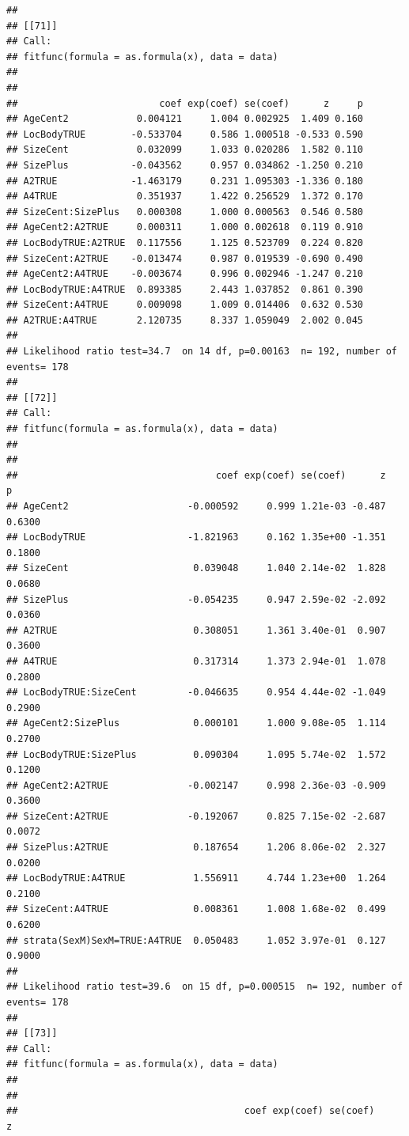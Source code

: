 \documentclass{article}\usepackage[]{graphicx}\usepackage[]{color}
\makeatletter
\newenvironment{kframe}{%
 \def\at@end@of@kframe{}%
 \ifinner\ifhmode%
  \def\at@end@of@kframe{\end{minipage}}%
  \begin{minipage}{\columnwidth}%
 \fi\fi%
 \def\FrameCommand##1{\hskip\@totalleftmargin \hskip-\fboxsep
 \colorbox{shadecolor}{##1}\hskip-\fboxsep
     \hskip-\linewidth \hskip-\@totalleftmargin \hskip\columnwidth}%
 \MakeFramed {\advance\hsize-\width
   \@totalleftmargin\z@ \linewidth\hsize
   \@setminipage}}%
 {\par\unskip\endMakeFramed%
 \at@end@of@kframe}
\newenvironment{knitrout}{}{} %
\makeatother
\begin{document}
\begin{knitrout}
\begin{kframe}
\begin{verbatim}
## 
## [[71]]
## Call:
## fitfunc(formula = as.formula(x), data = data)
## 
## 
##                         coef exp(coef) se(coef)      z     p
## AgeCent2            0.004121     1.004 0.002925  1.409 0.160
## LocBodyTRUE        -0.533704     0.586 1.000518 -0.533 0.590
## SizeCent            0.032099     1.033 0.020286  1.582 0.110
## SizePlus           -0.043562     0.957 0.034862 -1.250 0.210
## A2TRUE             -1.463179     0.231 1.095303 -1.336 0.180
## A4TRUE              0.351937     1.422 0.256529  1.372 0.170
## SizeCent:SizePlus   0.000308     1.000 0.000563  0.546 0.580
## AgeCent2:A2TRUE     0.000311     1.000 0.002618  0.119 0.910
## LocBodyTRUE:A2TRUE  0.117556     1.125 0.523709  0.224 0.820
## SizeCent:A2TRUE    -0.013474     0.987 0.019539 -0.690 0.490
## AgeCent2:A4TRUE    -0.003674     0.996 0.002946 -1.247 0.210
## LocBodyTRUE:A4TRUE  0.893385     2.443 1.037852  0.861 0.390
## SizeCent:A4TRUE     0.009098     1.009 0.014406  0.632 0.530
## A2TRUE:A4TRUE       2.120735     8.337 1.059049  2.002 0.045
## 
## Likelihood ratio test=34.7  on 14 df, p=0.00163  n= 192, number of events= 178 
## 
## [[72]]
## Call:
## fitfunc(formula = as.formula(x), data = data)
## 
## 
##                                   coef exp(coef) se(coef)      z      p
## AgeCent2                     -0.000592     0.999 1.21e-03 -0.487 0.6300
## LocBodyTRUE                  -1.821963     0.162 1.35e+00 -1.351 0.1800
## SizeCent                      0.039048     1.040 2.14e-02  1.828 0.0680
## SizePlus                     -0.054235     0.947 2.59e-02 -2.092 0.0360
## A2TRUE                        0.308051     1.361 3.40e-01  0.907 0.3600
## A4TRUE                        0.317314     1.373 2.94e-01  1.078 0.2800
## LocBodyTRUE:SizeCent         -0.046635     0.954 4.44e-02 -1.049 0.2900
## AgeCent2:SizePlus             0.000101     1.000 9.08e-05  1.114 0.2700
## LocBodyTRUE:SizePlus          0.090304     1.095 5.74e-02  1.572 0.1200
## AgeCent2:A2TRUE              -0.002147     0.998 2.36e-03 -0.909 0.3600
## SizeCent:A2TRUE              -0.192067     0.825 7.15e-02 -2.687 0.0072
## SizePlus:A2TRUE               0.187654     1.206 8.06e-02  2.327 0.0200
## LocBodyTRUE:A4TRUE            1.556911     4.744 1.23e+00  1.264 0.2100
## SizeCent:A4TRUE               0.008361     1.008 1.68e-02  0.499 0.6200
## strata(SexM)SexM=TRUE:A4TRUE  0.050483     1.052 3.97e-01  0.127 0.9000
## 
## Likelihood ratio test=39.6  on 15 df, p=0.000515  n= 192, number of events= 178 
## 
## [[73]]
## Call:
## fitfunc(formula = as.formula(x), data = data)
## 
## 
##                                        coef exp(coef) se(coef)      z

\end{verbatim}
\end{kframe}
\end{knitrout}
\end{document}
